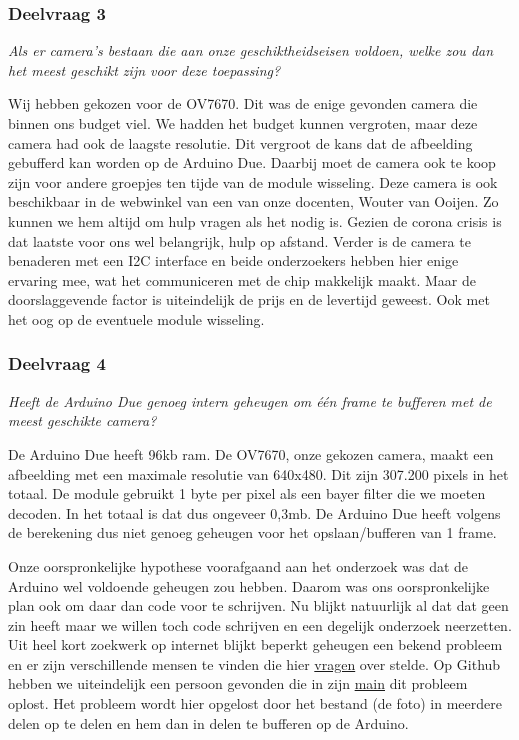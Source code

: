 \documentclass{article}
\begin{document}
\subsubsection{Deelvraag 3}
\textit{Als er camera’s bestaan die aan onze geschiktheidseisen voldoen, welke zou dan het meest geschikt zijn voor deze toepassing? }

Wij hebben gekozen voor de OV7670. Dit was de enige gevonden camera die binnen ons budget viel. We hadden het budget kunnen vergroten, maar deze camera had ook de laagste resolutie. Dit vergroot de kans dat de afbeelding gebufferd kan worden op de Arduino Due. Daarbij moet de camera ook te koop zijn voor andere groepjes ten tijde van de module wisseling.  Deze camera is ook beschikbaar in de webwinkel van een van onze docenten, Wouter van Ooijen. Zo kunnen we hem altijd om hulp vragen als het nodig is. Gezien de corona crisis is dat laatste voor ons wel belangrijk, hulp op afstand. Verder is de camera te benaderen met een I2C interface en beide onderzoekers hebben hier enige ervaring mee, wat het communiceren met de chip makkelijk maakt. Maar de doorslaggevende factor is uiteindelijk de prijs en de levertijd geweest. Ook met het oog op de eventuele module wisseling.
\subsubsection{Deelvraag 4}
\textit{Heeft de Arduino Due genoeg intern geheugen om één frame te bufferen met de meest geschikte camera? }

De Arduino Due heeft 96kb ram. De OV7670, onze gekozen camera, maakt een afbeelding met een maximale resolutie van 640x480. Dit zijn 307.200 pixels in het totaal. De module gebruikt 1 byte per pixel als een bayer filter die we moeten decoden. In het totaal is dat dus ongeveer 0,3mb. De Arduino Due heeft volgens de berekening dus niet genoeg geheugen voor het opslaan/bufferen van 1 frame.

Onze oorspronkelijke hypothese voorafgaand aan het onderzoek was dat de Arduino wel voldoende geheugen zou hebben. Daarom was ons oorspronkelijke plan ook om daar dan code voor te schrijven. Nu blijkt natuurlijk al dat dat geen zin heeft maar we willen toch code schrijven en een degelijk onderzoek neerzetten.
Uit heel kort zoekwerk op internet blijkt beperkt geheugen een bekend probleem en er zijn verschillende mensen te vinden die hier \href{https://forum.arduino.cc/index.php?topic=159557.0}{vragen} over stelde. Op Github hebben we uiteindelijk een persoon gevonden die in zijn \href{https://github.com/ComputerNerd/ov7670-simple/blob/master/main.c}{main} dit probleem oplost. Het probleem wordt hier opgelost door het bestand (de foto) in meerdere delen op te delen en hem dan in delen te bufferen op de Arduino. 
\end{document}
